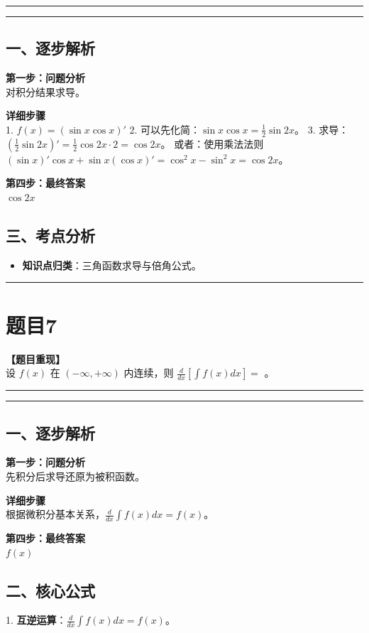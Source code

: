 \documentclass[12pt, a4paper]{ctexart}
\newcommand{\TopSeparator}{
    \par\noindent\rule{\textwidth}{1.5pt}\vspace{0.5em} %
}
\newcommand{\AnalysisSeparator}{
    \par\noindent\rule{\textwidth}{0.5pt}\vspace{0.2em}\hrule\vspace{0.5em} %
}
\newenvironment{RedAnalysis}{
    \par
    \color{red} %
}{
    \par
    \color{black} %
}
\begin{document}
\AnalysisSeparator

\begin{RedAnalysis}

\subsection*{一、逐步解析}

\textbf{第一步：问题分析} \\
对积分结果求导。

\textbf{详细步骤} \\
1. $f(x) = (\sin x \cos x)'$
2. 可以先化简：$\sin x \cos x = \frac{1}{2} \sin 2x$。
3. 求导：$(\frac{1}{2} \sin 2x)' = \frac{1}{2} \cos 2x \cdot 2 = \cos 2x$。
   或者：使用乘法法则 $(\sin x)'\cos x + \sin x (\cos x)' = \cos^2 x - \sin^2 x = \cos 2x$。

\textbf{第四步：最终答案} \\
$ \cos 2x $

\subsection*{三、考点分析}
\begin{itemize}
    \item \textbf{知识点归类}：三角函数求导与倍角公式。
\end{itemize}

\end{RedAnalysis}

\vspace{2em}

\TopSeparator
\section*{题目7}

\textbf{【题目重现】} \\
设 $ f(x) $ 在 $ (-\infty,+\infty) $ 内连续，则 $ \frac{d}{dx}[\int f(x)dx]= $ \underline{\hspace{2cm}}。

\AnalysisSeparator

\begin{RedAnalysis}

\subsection*{一、逐步解析}

\textbf{第一步：问题分析} \\
先积分后求导还原为被积函数。

\textbf{详细步骤} \\
根据微积分基本关系，$\frac{d}{dx} \int f(x) dx = f(x)$。

\textbf{第四步：最终答案} \\
$ f(x) $

\subsection*{二、核心公式}
1. \textbf{互逆运算}：$\frac{d}{dx}\int f(x) dx = f(x)$。

\end{RedAnalysis}
\end{document}
